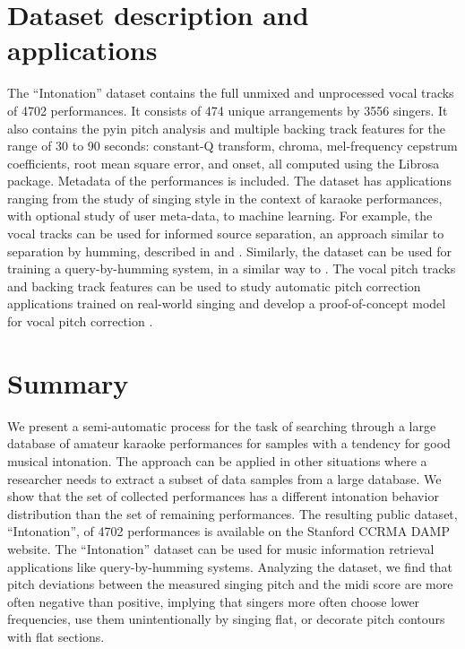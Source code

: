 \section{Dataset description and applications}
The ``Intonation'' dataset contains the full unmixed and unprocessed vocal tracks of 4702 performances. It consists of 474 unique arrangements by 3556 singers. It also contains the \gls{pyin} pitch analysis and multiple backing track features for the range of 30 to 90 seconds: constant-Q transform, chroma, mel-frequency cepstrum coefficients, root mean square error, and onset, all computed using the Librosa \cite{mcfee2015librosa} package. Metadata of the performances is included. The dataset has applications ranging from the study of singing style in the context of karaoke performances, with optional study of user meta-data, to machine learning. For example, the vocal tracks can be used for informed source separation, an approach similar to separation by humming, described in \cite{smaragdis2009separation} and \cite{liutkus2012informed}. Similarly, the dataset can be used for training a query-by-humming system, in a similar way to \cite{huq2010crowdsourcing}. The vocal pitch tracks and backing track features can be used to study automatic pitch correction applications trained on real-world singing and develop a proof-of-concept model for vocal pitch correction \cite{wager2020deep}.

\section{Summary}
We present a semi-automatic process for the task of searching through a large database of amateur karaoke performances for samples with a tendency for good musical intonation. The approach can be applied in other situations where a researcher needs to extract a subset of data samples from a large database. We show that the set of collected performances has a different intonation behavior distribution than the set of remaining performances. The resulting public dataset, ``Intonation'', of 4702 performances is available on the Stanford CCRMA DAMP website. The ``Intonation'' dataset can be used for music information retrieval applications like query-by-humming systems. Analyzing the dataset, we find that pitch deviations between the measured singing pitch and the \gls{midi} score are more often negative than positive, implying that singers more often choose lower frequencies, use them unintentionally by singing flat, or decorate pitch contours with flat sections.